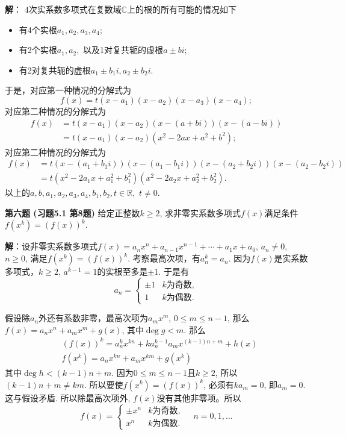 \ifIncludeAnswer

\newpageorvspace

{\bf 解}： $4$次实系数多项式在复数域$\mathbb{C}$上的根的所有可能的情况如下
\begin{itemize}
\item 有4个实根$a_1, a_2, a_3, a_4;$
\item 有2个实根$a_1, a_2,$ 以及1对复共轭的虚根$a \pm bi;$
\item 有2对复共轭的虚根$a_1 \pm b_1i, a_2 \pm b_2i.$
\end{itemize}
于是，对应第一种情况的分解式为
$$f(x) = t(x-a_1)(x-a_2)(x-a_3)(x-a_4);$$
对应第二种情况的分解式为
\begin{align*}
f(x) & = t(x-a_1)(x-a_2)(x-(a + bi))(x-(a - bi)) \\
& = t(x-a_1)(x-a_2)(x^2-2ax+a^2+b^2);
\end{align*}
对应第二种情况的分解式为
\begin{align*}
f(x) & = t(x-(a_1 + b_1i))(x-(a_1 - b_1i))(x-(a_2 + b_2i))(x-(a_2 - b_2i)) \\
& = t(x^2-2a_1x+a_1^2+b_1^2)(x^2-2a_2x+a_2^2+b_2^2).
\end{align*}
以上的$a, b, a_1, a_2, a_3, a_4, b_1, b_2, t \in \mathbb{R},$ $t \neq 0.$

\fi  %

\newpageorvspace

{\bf 第六题 (习题5.1 第8题)} 给定正整数$k\geqslant 2$, 求非零实系数多项式$f(x)$满足条件$f(x^k) = (f(x))^k$.

\ifIncludeAnswer

\newpageorvspace

{\bf 解}：设非零实系数多项式$f(x) = a_nx^n + a_{n-1}x^{n-1} + \cdots + a_1x + a_0$, $a_n\neq 0$, $n\geqslant 0$, 满足$f(x^k) = (f(x))^k$. 考察最高次项，有$a_n^k = a_n$. 因为$f(x)$是实系数多项式，$k\geqslant 2$, $a^{k-1} = 1$的实根至多是$\pm 1.$ 于是有
$$a_n = \begin{cases}\pm 1 & \text{$k$为奇数}, \\ 1 & \text{$k$为偶数}. \end{cases}$$

假设除$a_n$外还有系数非零，最高次项为$a_mx^m$, $0 \leqslant m \leqslant n-1$, 那么$f(x) = a_nx^n + a_mx^m + g(x)$, 其中$\deg g < m$. 那么
\begin{align*}
& (f(x))^k = a_n^kx^{kn} + ka_n^{k-1}a_mx^{(k-1)n+m} + h(x) \\
& f(x^k) = a_nx^{kn} + a_mx^{km} + g(x^k)
\end{align*}
其中$\deg h < (k-1)n+m$. 因为$0 \leqslant m \leqslant n-1$且$k\geqslant 2$, 所以$(k-1)n+m \neq km$. 所以要使$f(x^k) = (f(x))^k$, 必须有$ka_m = 0$, 即$a_m = 0$. 这与假设矛盾. 所以除最高次项外, $f(x)$没有其他非零项。所以
$$f(x) = \begin{cases}\pm x^n & \text{$k$为奇数}, \\ x^n & \text{$k$为偶数}. \end{cases} \quad n = 0, 1, \ldots$$

\fi  %


